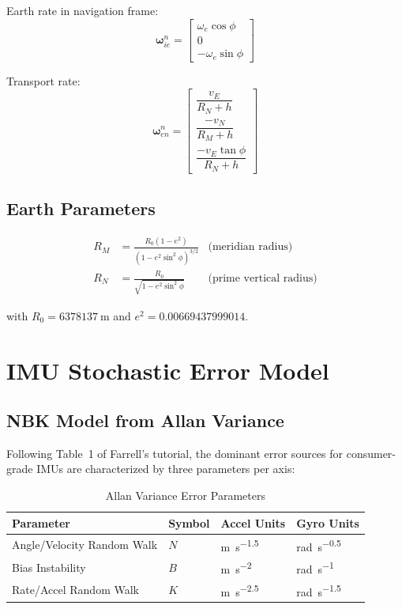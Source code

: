 \documentclass[11pt,a4paper]{article}
\newcommand{\vect}[1]{\boldsymbol{#1}}
\begin{document}
Earth rate in navigation frame:
\begin{equation}
    \vect{\omega}_{ie}^n = \begin{bmatrix}
        \omega_e \cos\phi \\ 0 \\ -\omega_e \sin\phi
    \end{bmatrix}
\end{equation}

Transport rate:
\begin{equation}
    \vect{\omega}_{en}^n = \begin{bmatrix}
        \dfrac{v_E}{R_N + h} \\[1em]
        \dfrac{-v_N}{R_M + h} \\[1em]
        \dfrac{-v_E \tan\phi}{R_N + h}
    \end{bmatrix}
\end{equation}

\subsection{Earth Parameters}

\begin{align}
    R_M &= \frac{R_0(1-e^2)}{(1 - e^2\sin^2\phi)^{3/2}} & \text{(meridian radius)} \\
    R_N &= \frac{R_0}{\sqrt{1 - e^2\sin^2\phi}} & \text{(prime vertical radius)}
\end{align}

with $R_0 = \SI{6378137}{\meter}$ and $e^2 = 0.00669437999014$.

\section{IMU Stochastic Error Model}

\subsection{NBK Model from Allan Variance}

Following Table~1 of Farrell's tutorial, the dominant error sources for consumer-grade IMUs are characterized by three parameters per axis:

\begin{table}[h]
\centering
\caption{Allan Variance Error Parameters}
\begin{tabular}{llll}
    \toprule
    \textbf{Parameter} & \textbf{Symbol} & \textbf{Accel Units} & \textbf{Gyro Units} \\
    \midrule
    Angle/Velocity Random Walk & $N$ & \si{\meter\per\second\tothe{1.5}} & \si{\radian\per\second\tothe{0.5}} \\
    Bias Instability & $B$ & \si{\meter\per\second\squared} & \si{\radian\per\second} \\
    Rate/Accel Random Walk & $K$ & \si{\meter\per\second\tothe{2.5}} & \si{\radian\per\second\tothe{1.5}} \\
    \bottomrule
\end{tabular}
\end{table}
\end{document}
